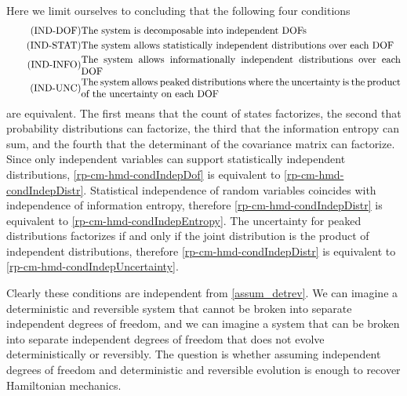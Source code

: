 Here we limit ourselves to concluding that the following four conditions
\begin{align}
	\tag{IND-DOF}\label{rp-cm-hmd-condIndepDof}
	&\eqtext{The system is decomposable into independent DOFs} \\
	\tag{IND-STAT}\label{rp-cm-hmd-condIndepDistr}
	&\eqtext{The system allows statistically independent distributions over each DOF} \\
	\tag{IND-INFO}\label{rp-cm-hmd-condIndepEntropy}
	&\eqtext{The system allows informationally independent distributions over each DOF} \\
	\tag{IND-UNC}\label{rp-cm-hmd-condIndepUncertainty}
	&\eqtext{The system allows peaked distributions where the uncertainty is the product of the uncertainty on each DOF}
\end{align}
are equivalent. The first means that the count of states factorizes, the second that probability distributions can factorize, the third that the information entropy can sum, and the fourth that the determinant of the covariance matrix can factorize. Since only independent variables can support statistically independent distributions, \ref{rp-cm-hmd-condIndepDof} is equivalent to \ref{rp-cm-hmd-condIndepDistr}. Statistical independence of random variables coincides with independence of information entropy, therefore \ref{rp-cm-hmd-condIndepDistr} is equivalent to \ref{rp-cm-hmd-condIndepEntropy}. The uncertainty for peaked distributions factorizes if and only if the joint distribution is the product of independent distributions, therefore  \ref{rp-cm-hmd-condIndepDistr} is equivalent to \ref{rp-cm-hmd-condIndepUncertainty}.

Clearly these conditions are independent from \ref{assum_detrev}. We can imagine a deterministic and reversible system that cannot be broken into separate independent degrees of freedom, and we can imagine a system that can be broken into separate independent degrees of freedom that does not evolve deterministically or reversibly. The question is whether assuming independent degrees of freedom and deterministic and reversible evolution is enough to recover Hamiltonian mechanics. 

